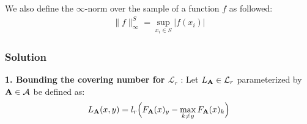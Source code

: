\noindent We also define the $\infty$-norm over the sample of a function $f$ as followed:
\begin{align*}
    \|f\|_\infty^S = \sup_{x_i \in S} |f(x_i)|
\end{align*}

\color{black}

\subsubsection{Solution}

\textbf{1. Bounding the covering number for $\mathcal{L}_r$} : Let $L_{\bf A} \in \mathcal{L}_r$ parameterized by ${\bf A}\in\mathcal{A}$ be defined as:
\begin{align*}
    L_{\bf A}(x, y) = l_r\Big( 
        F_{\bf A}(x)_y - \max_{k\ne y} F_{\bf A}(x)_k
     \Big)
\end{align*}

